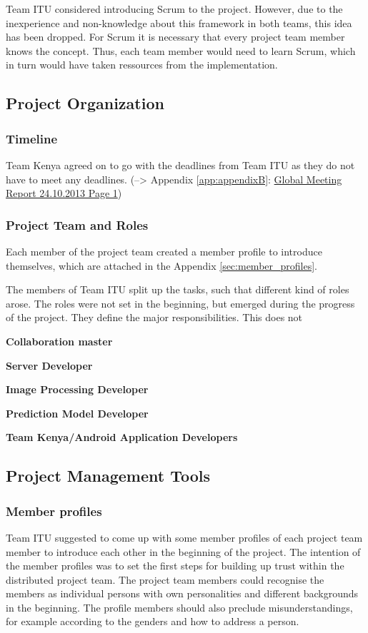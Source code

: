 Team ITU considered introducing Scrum to the project. However, due to the inexperience and non-knowledge about this framework in both teams, this idea has been dropped. For Scrum it is necessary that every project team member knows the concept. Thus, each team member would need to learn Scrum, which in turn would have taken ressources from the implementation.


\subsection{Project Organization}

\subsubsection{Timeline}
Team Kenya agreed on to go with the deadlines from Team ITU as they do not have to meet any deadlines. (--> Appendix \ref{app:appendixB}: \hyperlink{GSD20131024.1}{Global Meeting Report 24.10.2013 Page 1})

\subsubsection{Project Team and Roles}
Each member of the project team created a member profile to introduce themselves, which are attached in the Appendix \ref{sec:member_profiles}.

The members of Team ITU split up the tasks, such that different kind of roles arose. The roles were not set in the beginning, but emerged during the progress of the project. They define the major responsibilities. This does not

\textbf{Collaboration master}

\textbf{Server Developer}

\textbf{Image Processing Developer}

\textbf{Prediction Model Developer}

\textbf{Team Kenya/Android Application Developers}



\subsection{Project Management Tools}

\subsubsection {Member profiles}
Team ITU suggested to come up with some member profiles of each project team member to introduce each other in the beginning of the project. The intention of the member profiles was to set the first steps for building up trust within the distributed project team. The project team members could recognise the members as individual persons with own personalities and different backgrounds in the beginning. The profile members should also preclude misunderstandings, for example according to the genders and how to address a person.

